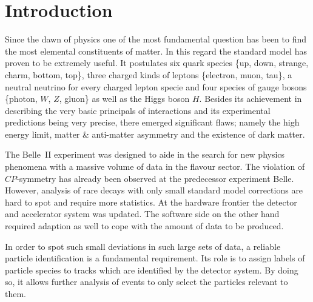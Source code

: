 \chapter{Introduction}
\label{chap:introduction}

Since the dawn of physics one of the most fundamental question has been to find the most elemental constituents of matter. In this regard the standard model has proven to be extremely useful. It postulates six quark species \{up, down, strange, charm, bottom, top\}, three charged kinds of leptons \{electron, muon, tau\}, a neutral neutrino for every charged lepton specie and four species of gauge bosons \{photon, $W$, $Z$, gluon\} as well as the Higgs boson $H$. Besides its achievement in describing the very basic principals of interactions and its experimental predictions being very precise, there emerged significant flaws; namely the high energy limit, matter \& anti-matter asymmetry and the existence of dark matter.

The Belle~\RN{2} experiment was designed to aide in the search for new physics phenomena with a massive volume of data in the flavour sector. The violation of $CP$-symmetry has already been observed at the predecessor experiment Belle. However, analysis of rare decays with only small standard model corrections are hard to spot and require more statistics. At the hardware frontier the detector and accelerator system was updated. The software side on the other hand required adaption as well to cope with the amount of data to be produced.

In order to spot such small deviations in such large sets of data, a reliable particle identification is a fundamental requirement. Its role is to assign labels of particle species to tracks which are identified by the detector system. By doing so, it allows further analysis of events to only select the particles relevant to them.

